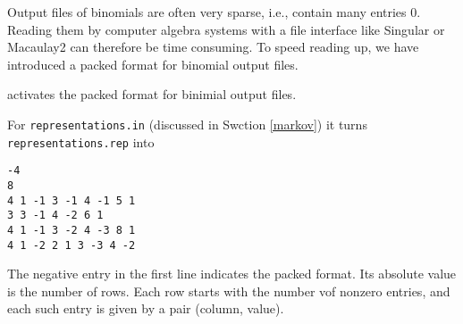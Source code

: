 Output files of binomials are often very sparse, i.e., contain many entries $0$. Reading them by computer  algebra systems with a file interface like Singular or Macaulay2 can therefore be time consuming. To speed reading up, we have introduced a packed format for binomial output files.
\begin{itemize}
	\itemtt[BinomialsPacked] activates the packed format for binimial output files.
\end{itemize}
For \verb|representations.in| (discussed in Swction \ref{markov}) it turns \verb|representations.rep| into
\begin{Verbatim}
-4
8
4 1 -1 3 -1 4 -1 5 1 
3 3 -1 4 -2 6 1 
4 1 -1 3 -2 4 -3 8 1 
4 1 -2 2 1 3 -3 4 -2
\end{Verbatim}
The negative entry in the first line indicates the packed format. Its absolute value is the number of rows. Each row starts with the number vof nonzero entries, and each such entry is given by a pair (column, value).



